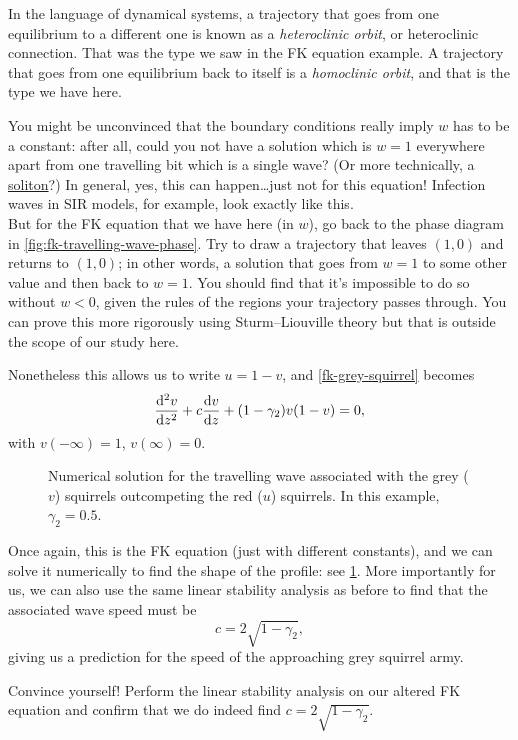 \documentclass[main.tex]{subfiles}
\begin{document}
\begin{nem}
In the language of dynamical systems, a trajectory that goes from one equilibrium to a different one is known as a \emph{heteroclinic orbit}, or heteroclinic connection. That was the type we saw in the FK equation example. A trajectory that goes from one equilibrium  back to itself is a \emph{homoclinic orbit}, and that is the type we have here. 
\end{nem}

\begin{do-it-yourself}
You might be unconvinced that the boundary conditions really imply $w$ has to be a constant: after all, could you not have a solution which is $w=1$ everywhere apart from one travelling bit which is a single wave? (Or more technically, a \href{https://en.wikipedia.org/wiki/Soliton}{soliton}?) In general, yes, this can happen\dots just not for this equation! Infection waves in SIR models, for example, look exactly like this. \\[1ex]
But for the FK equation that we have here (in $w$), go back to the phase diagram in \cref{fig:fk-travelling-wave-phase}. Try to draw a trajectory that leaves $(1,0)$ and returns to $(1,0)$; in other words, a solution that goes from $w=1$ to some other value and then back to $w=1$. You should find that it's impossible to do so without $w<0$, given the rules of the regions your trajectory passes through. You can prove this more rigorously using Sturm--Liouville theory but that is outside the scope of our study here.
\end{do-it-yourself}

Nonetheless this allows us to write $u=1-v$, and \cref{fk-grey-squirrel} becomes
\begin{equation}
	\fdd{v}{z} + c \fd{v}{z} + (1-\gamma_2)v(1-v) = 0,
\end{equation}
with $v(-\infty) = 1$, $v(\infty) = 0$. 

\begin{figure}
\centering

\caption{Numerical solution for the travelling wave associated with the grey ($v$) squirrels outcompeting the red ($u$) squirrels. In this example, $\gamma_2=0.5$.}
\label{fig:fk-travelling-wave-squirrels}
\end{figure}
Once again, this is the FK equation (just with different constants), and we can solve it numerically to find the shape of the profile: see \cref{fig:fk-travelling-wave-squirrels}. More importantly for us, we can also use the same linear stability analysis as before to find that the associated wave speed must be
\begin{equation}
	c = 2\sqrt{1-\gamma_2},
\end{equation}
giving us a prediction for the speed of the approaching grey squirrel army.
\begin{do-it-yourself}
	Convince yourself! Perform the linear stability analysis on our altered FK equation and confirm that we do indeed find $c = 2\sqrt{1-\gamma_2}$.
\end{do-it-yourself}
\end{document}
